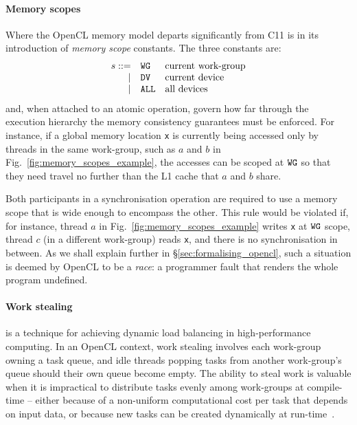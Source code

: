 \documentclass[svgnames,10pt]{sigplanconf}
\theoremstyle{definition}
\newcommand\swg{{\tt WG}}
\newcommand\sdv{{\tt DV}}
\newcommand\sall{{\tt ALL}}
\begin{document}
\paragraph{Memory scopes} Where the OpenCL memory model departs
significantly from C11 is in its introduction of \emph{memory
scope} constants. The three constants are:
\[
\begin{array}{rlllll}
s ::= & \swg & \text{current work-group} \\
 \mid & \sdv & \text{current device} \\
 \mid & \sall & \text{all devices}
\end{array}
\] 
and, when attached to an atomic operation, govern how far through the
execution hierarchy the memory consistency guarantees must be
enforced. For instance, if a global memory location \texttt{x} is
currently being accessed only by threads in the same work-group, such
as $a$ and $b$ in Fig.~\ref{fig:memory_scopes_example}, the accesses can be scoped at $\swg$ so that they need travel no further than the L1 cache that $a$ and $b$ share.

Both participants in a synchronisation operation are required to use a
memory scope that is wide enough to encompass the other. This rule
would be violated if, for instance, thread $a$ in
Fig.~\ref{fig:memory_scopes_example} writes \texttt{x} at $\swg$
scope, thread $c$ (in a different work-group) reads \texttt{x}, and
there is no synchronisation in between. As we shall explain further in
\S\ref{sec:formalising_opencl}, such a situation is deemed by OpenCL
to be a \emph{race}: a programmer fault that renders the whole program
undefined.

\paragraph*{Work stealing} is a technique for achieving dynamic load
balancing in high-performance computing. In an OpenCL context, work
stealing involves each work-group owning a task queue, and idle
threads popping tasks from another work-group's queue should their
own queue become empty. The ability to steal work is valuable when it
is impractical to distribute tasks evenly among work-groups at
compile-time -- either because of a non-uniform computational cost per
task that depends on input data, or because new tasks can be created
dynamically at run-time~\cite{cederman+12}.
\end{document}
